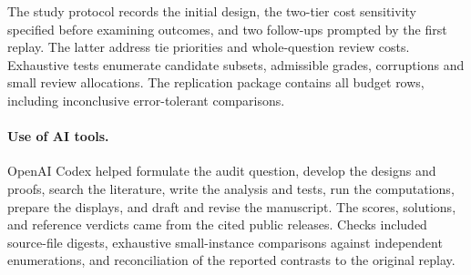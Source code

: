 The study protocol records the initial design, the two-tier cost sensitivity specified before examining outcomes, and two follow-ups prompted by the first replay. The latter address tie priorities and whole-question review costs. Exhaustive tests enumerate candidate subsets, admissible grades, corruptions and small review allocations. The replication package contains all budget rows, including inconclusive error-tolerant comparisons.

\paragraph{Use of AI tools.} OpenAI Codex helped formulate the audit question, develop the designs and proofs, search the literature, write the analysis and tests, run the computations, prepare the displays, and draft and revise the manuscript. The scores, solutions, and reference verdicts came from the cited public releases. Checks included source-file digests, exhaustive small-instance comparisons against independent enumerations, and reconciliation of the reported contrasts to the original replay.
